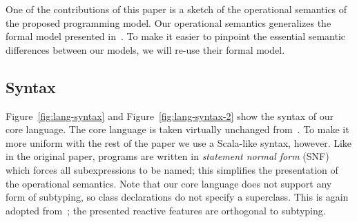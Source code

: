 \documentclass{acm_proc_article-sp}
\begin{document}
One of the contributions of this paper is a sketch of the operational semantics of the
proposed programming model. Our operational semantics generalizes the formal
model presented in~\cite{FormalizingAsync}. To make it easier to pinpoint the essential
semantic differences between our models, we will re-use their formal model.

\subsection{Syntax}

Figure~\ref{fig:lang-syntax} and Figure~\ref{fig:lang-syntax-2} show the
syntax of our core language. The core language is taken virtually unchanged
from~\cite{FormalizingAsync}. To make it more uniform with the rest of the
paper we use a Scala-like syntax, however. Like in the original paper, programs
are written in {\em statement normal form} (SNF) which forces all
subexpressions to be named; this simplifies the presentation of the
operational semantics. Note that our core language does not support any form
of subtyping, so class declarations do not specify a superclass. This is again
adopted from~\cite{FormalizingAsync}; the presented reactive features are
orthogonal to subtyping.
\end{document}
